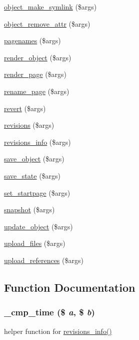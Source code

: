 \begin{DoxyCompactItemize}
\hyperlink{module__glue_8inc_8php_a14e6da411df5aa9ff38e2d4ea27dd077}{object\_\-make\_\-symlink} (\$args)
\item 
\hyperlink{module__glue_8inc_8php_ae16d748c2d933978daec8bf11acdc34b}{object\_\-remove\_\-attr} (\$args)
\item 
\hyperlink{module__glue_8inc_8php_a354fc85f928484ae3b316bbf0065d9bd}{pagenames} (\$args)
\item 
\hyperlink{module__glue_8inc_8php_ae9103a74e4b40e88536fbc0a52d1c72f}{render\_\-object} (\$args)
\item 
\hyperlink{module__glue_8inc_8php_aab1981a767de519c6c4afb946d748d0a}{render\_\-page} (\$args)
\item 
\hyperlink{module__glue_8inc_8php_acd08b36587528b6f088cafb7d1d6bd29}{rename\_\-page} (\$args)
\item 
\hyperlink{module__glue_8inc_8php_ae69e25beb40feedc02d3b850587d20cc}{revert} (\$args)
\item 
\hyperlink{module__glue_8inc_8php_a27d90d2ed1b4142554bc4e0e47e9ba0c}{revisions} (\$args)
\item 
\hyperlink{module__glue_8inc_8php_a1dc65b69a920ac4ebc8f7c1df305060b}{revisions\_\-info} (\$args)
\item 
\hyperlink{module__glue_8inc_8php_ab294f21c7f6fed0932b65167f180c78c}{save\_\-object} (\$args)
\item 
\hyperlink{module__glue_8inc_8php_a60d03d7a0d8783e926835f0aa6cff698}{save\_\-state} (\$args)
\item 
\hyperlink{module__glue_8inc_8php_aafa7a8fa046ff6119cb7506d68edf787}{set\_\-startpage} (\$args)
\item 
\hyperlink{module__glue_8inc_8php_a5d3ad02088eee566589cd47fe0dc889a}{snapshot} (\$args)
\item 
\hyperlink{module__glue_8inc_8php_a4aed316adcde13b40c9fc1b35e6537a4}{update\_\-object} (\$args)
\item 
\hyperlink{module__glue_8inc_8php_a43746135e67f614d79317029aced064b}{upload\_\-files} (\$args)
\item 
\hyperlink{module__glue_8inc_8php_a2099347b9bdf5a5973a13e5f7a4be933}{upload\_\-references} (\$args)
\end{DoxyCompactItemize}


\subsection{Function Documentation}
\hypertarget{module__glue_8inc_8php_a5fea6c120a24a298149febcbf3b1df10}{
\subsubsection[{\_\-cmp\_\-time}]{\setlength{\rightskip}{0pt plus 5cm}\_\-cmp\_\-time (\$ {\em a}, \/  \$ {\em b})}}
\label{module__glue_8inc_8php_a5fea6c120a24a298149febcbf3b1df10}
helper function for \hyperlink{module__glue_8inc_8php_a1dc65b69a920ac4ebc8f7c1df305060b}{revisions\_\-info()}


